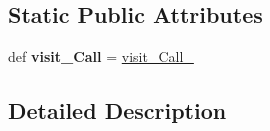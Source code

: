 \subsection*{Static Public Attributes}
\begin{DoxyCompactItemize}
\item 
\mbox{\label{class__pytest_1_1assertion_1_1rewrite_1_1_assertion_rewriter_a44845a80cc1ef1cfa8e6074c8d67e85e}} 
def {\bfseries visit\+\_\+\+Call} = \hyperlink{class__pytest_1_1assertion_1_1rewrite_1_1_assertion_rewriter_a7f0d51a7cfa01a996bbbfb91c1e0440b}{visit\+\_\+\+Call\+\_}
\end{DoxyCompactItemize}


\subsection{Detailed Description}
